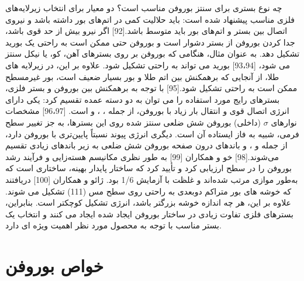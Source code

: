 چه نوع بستری برای سنتز بوروفن مناسب است؟ دو معیار برای انتخاب زیرلایه‌های فلزی مناسب پیشنهاد شده است: باید حلالیت کمی در اتم‌های بور داشته باشد و نیروی اتصال بین بستر و اتم‌های بور باید متوسط باشد.[92] اگر نیرو بیش از حد قوی باشد، جدا کردن بوروفن از بستر دشوار است و بوروفن حتی ممکن است به راحتی یک بورید تشکیل دهد. به عنوان مثال، هنگامی که بوروفن بر روی بسترهای آهن، کو، یا نیکل سنتز می شود، [93،94] بورید می تواند به راحتی تشکیل شود. علاوه بر این، در زیرلایه های طلا، از آنجایی که برهمکنش بین اتم طلا و بور بسیار ضعیف است، بور غیرمسطح ممکن است به راحتی تشکیل شود.[95] با توجه به برهمکنش بین بوروفن و بستر فلزی، بسترهای رایج مورد استفاده را می توان به دو دسته عمده تقسیم کرد: یکی دارای انرژی اتصال قوی و انتقال بار زیاد با بوروفن، از جمله ، ، و  است. [96،97] مشخصات نوارهای $\sigma$ (داخلی) بوروفن شش ضلعی سنتز شده روی این بسترها، به جز تغییر سطح فرمی، شبیه به فاز ایستاده آن است. دیگری انرژی پیوند نسبتاً پایین‌تری با بوروفن دارد، از جمله  و ، و باندهای درون صفحه بوروفن شش ضلعی به زیر باندهای زیادی تقسیم می‌شوند.[98] خو و همکاران [99] به طور نظری مکانیسم هسته‌زایی و فرآیند رشد بوروفن را در سطح  ارزیابی کرد و تأیید کرد که ساختار پایدار بهینه، ساختاری است که  به‌طور موازی مرتب شده‌اند و غلظت  با آزمایش 1/6 بود. ژائو و همکاران [100] دریافتند که خوشه های بور متراکم دوبعدی به راحتی روی سطح مس (111) تشکیل می شوند. علاوه بر این، هر چه اندازه خوشه بزرگتر باشد، انرژی تشکیل کوچکتر است. بنابراین، بسترهای فلزی تفاوت زیادی در ساختار بوروفن ایجاد شده ایجاد می کنند و انتخاب یک بستر مناسب با توجه به محصول مورد نظر اهمیت ویژه ای دارد.

\section{خواص بوروفن}
